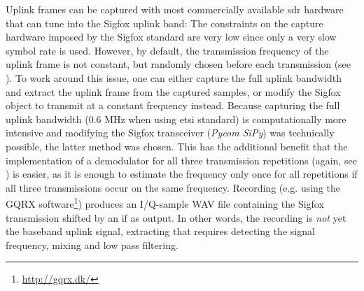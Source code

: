 Uplink frames can be captured with most commercially available \gls{sdr} hardware that can tune into the Sigfox uplink band: The constraints on the capture hardware imposed by the Sigfox standard are very low since only a very slow symbol rate is used.
However, by default, the transmission frequency of the uplink frame is not constant, but randomly chosen before each transmission (see ).
To work around this issue, one can either capture the full uplink bandwidth and extract the uplink frame from the captured samples, or modify the Sigfox object to transmit at a constant frequency instead.
Because capturing the full uplink bandwidth (0.6 MHz when using \gls{etsi} standard) is computationally more intensive and modifying the Sigfox transceiver (\textit{\textit{Pycom SiPy}}) was technically possible, the latter method was chosen.
This has the additional benefit that the implementation of a demodulator for all three transmission repetitions (again, see ) is easier, as it is enough to estimate the frequency only once for all repetitions if all three transmissions occur on the same frequency.
Recording (e.g. using the GQRX software\footnote{\url{http://gqrx.dk/}}) produces an I/Q-sample WAV file containing the Sigfox transmission shifted by an \gls{if} as output.
In other words, the recording is \textit{not} yet the baseband uplink signal, extracting that requires detecting the signal frequency, mixing and low pass filtering.

